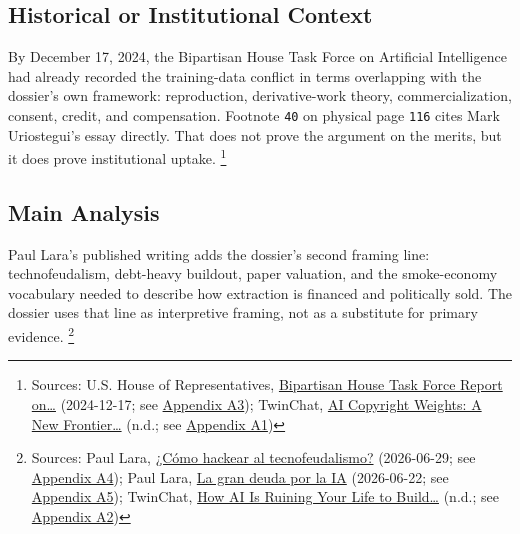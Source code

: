 \documentclass[
  american,
  11pt,
  letterpaper,
]{article}
\begin{document}
\subsection{Historical or Institutional
Context}\label{historical-or-institutional-context}

By December 17, 2024, the Bipartisan House Task Force on Artificial
Intelligence had already recorded the training-data conflict in terms
overlapping with the dossier's own framework: reproduction,
derivative-work theory, commercialization, consent, credit, and
compensation. Footnote \texttt{40} on physical page \texttt{116} cites
Mark Uriostegui's essay directly. That does not prove the argument on
the merits, but it does prove institutional uptake. \footnote{Sources:
  U.S. House of Representatives,
  \href{https://www.speaker.gov/wp-content/uploads/2024/12/AI-Task-Force-Report-FINAL.pdf}{Bipartisan
  House Task Force Report on\ldots{}} (2024-12-17; see
  \hyperref[appendix-a3-bipartisan-house-task-force-report-on-artificial-intelligence]{Appendix
  A3}); TwinChat,
  \href{https://medium.com/twinchat/ai-copyright-weights-a-new-frontier-in-intellectual-property-law-d8ee1b6c55ee}{AI
  Copyright Weights: A New Frontier\ldots{}} (n.d.; see
  \hyperref[appendix-a1-ai-copyright-weights-a-new-frontier-in-intellectual-property-law]{Appendix
  A1})}

\subsection{Main Analysis}\label{main-analysis}

Paul Lara's published writing adds the dossier's second framing line:
technofeudalism, debt-heavy buildout, paper valuation, and the
smoke-economy vocabulary needed to describe how extraction is financed
and politically sold. The dossier uses that line as interpretive
framing, not as a substitute for primary evidence. \footnote{Sources:
  Paul Lara,
  \href{https://www.dineroenimagen.com/paul-lara/como-hackear-al-tecnofeudalismo/186955}{¿Cómo
  hackear al tecnofeudalismo?} (2026-06-29; see
  \hyperref[appendix-a4-c-mo-hackear-al-tecnofeudalismo]{Appendix A4});
  Paul Lara,
  \href{https://www.dineroenimagen.com/paul-lara/la-gran-deuda-por-la-ia/186930}{La
  gran deuda por la IA} (2026-06-22; see
  \hyperref[appendix-a5-la-gran-deuda-por-la-ia]{Appendix A5});
  TwinChat,
  \href{https://medium.com/twinchat/how-ai-is-ruining-your-life-to-build-an-empire-8b6d02e55bc9}{How
  AI Is Ruining Your Life to Build\ldots{}} (n.d.; see
  \hyperref[appendix-a2-how-ai-is-ruining-your-life-to-build-an-empire]{Appendix
  A2})}
\end{document}
